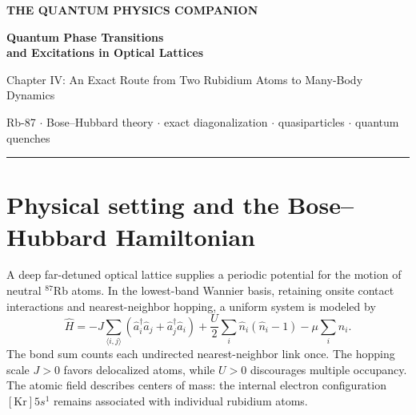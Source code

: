 \documentclass[11pt,a4paper]{article}
\newcounter{example}\newenvironment{worked}[1]{\refstepcounter{example}\par\medskip\noindent\textbf{\color{violet}Worked Example \theexample. #1}\par\smallskip}{\par\medskip}
\begin{document}
\begin{center}
{\Large\color{deep}\bfseries THE QUANTUM PHYSICS COMPANION}\par\vspace{5mm}
{\huge\bfseries Quantum Phase Transitions\\[2mm] and Excitations in Optical Lattices}\par\vspace{4mm}
{\large Chapter IV: An Exact Route from Two Rubidium Atoms to Many-Body Dynamics}\par\vspace{4mm}
{\color{muted}Rb-87 $\cdot$ Bose--Hubbard theory $\cdot$ exact diagonalization $\cdot$ quasiparticles $\cdot$ quantum quenches}\par\vspace{3mm}
\rule{.76\linewidth}{.6pt}
\end{center}
\begin{abstract}
This chapter starts from two bosons on two sites and derives the exact spectrum, eigenstates, double occupancy, number fluctuations and coherence. It then develops finite three-site diagonalization, strong-coupling excitations, lattice Bogoliubov modes, the thermodynamic superfluid--Mott transition, quantum quenches, and collapse--revival dynamics. All ``orbitals'' in the Bose--Hubbard description refer to the center-of-mass motion of complete neutral atoms, not to electronic $5s$ or $5p$ orbitals inside rubidium. Formulae and finite-size limits are stated explicitly, with worked examples and references.
\end{abstract}
\tableofcontents\newpage
\section{Physical setting and the Bose--Hubbard Hamiltonian}
A deep far-detuned optical lattice supplies a periodic potential for the motion of neutral $^{87}$Rb atoms. In the lowest-band Wannier basis, retaining onsite contact interactions and nearest-neighbor hopping, a uniform system is modeled by
\begin{equation}\boxed{\hat H=-J\sum_{\langle i,j\rangle}(\hat a_i^\dagger\hat a_j+\hat a_j^\dagger\hat a_i)+\frac U2\sum_i\hat n_i(\hat n_i-1)-\mu\sum_i\hat n_i.}\end{equation}
The bond sum counts each undirected nearest-neighbor link once. The hopping scale $J>0$ favors delocalized atoms, while $U>0$ discourages multiple occupancy. The atomic field describes centers of mass: the internal electron configuration $[\mathrm{Kr}]5s^1$ remains associated with individual rubidium atoms.
\end{document}
